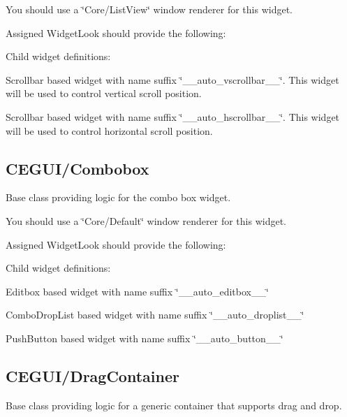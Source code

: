 You should use a \char`\"{}\+Core/\+List\+View\char`\"{} window renderer for this widget.

Assigned Widget\+Look should provide the following\+: 
\begin{DoxyItemize}
\item Child widget definitions\+: 
\begin{DoxyItemize}
\item Scrollbar based widget with name suffix \char`\"{}\+\_\+\+\_\+auto\+\_\+vscrollbar\+\_\+\+\_\+\char`\"{}. This widget will be used to control vertical scroll position. 
\item Scrollbar based widget with name suffix \char`\"{}\+\_\+\+\_\+auto\+\_\+hscrollbar\+\_\+\+\_\+\char`\"{}. This widget will be used to control horizontal scroll position. 
\end{DoxyItemize}
\end{DoxyItemize}\hypertarget{fal_baseclass_ref_fal_baseclass_ref_sec_4}{}\subsection{C\+E\+G\+U\+I/\+Combobox}\label{fal_baseclass_ref_fal_baseclass_ref_sec_4}
Base class providing logic for the combo box widget.

You should use a \char`\"{}\+Core/\+Default\char`\"{} window renderer for this widget.

Assigned Widget\+Look should provide the following\+: 
\begin{DoxyItemize}
\item Child widget definitions\+: 
\begin{DoxyItemize}
\item Editbox based widget with name suffix \char`\"{}\+\_\+\+\_\+auto\+\_\+editbox\+\_\+\+\_\+\char`\"{} 
\item Combo\+Drop\+List based widget with name suffix \char`\"{}\+\_\+\+\_\+auto\+\_\+droplist\+\_\+\+\_\+\char`\"{} 
\item Push\+Button based widget with name suffix \char`\"{}\+\_\+\+\_\+auto\+\_\+button\+\_\+\+\_\+\char`\"{} 
\end{DoxyItemize}
\end{DoxyItemize}\hypertarget{fal_baseclass_ref_fal_baseclass_ref_sec_5}{}\subsection{C\+E\+G\+U\+I/\+Drag\+Container}\label{fal_baseclass_ref_fal_baseclass_ref_sec_5}
Base class providing logic for a generic container that supports drag and drop.

